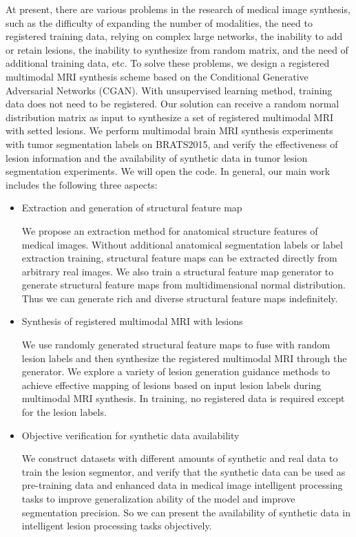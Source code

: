 \documentclass{ecai}
\begin{document}
At present, there are various problems in the research of medical image synthesis, such as the difficulty of expanding the number of modalities, the need to registered training data, relying on complex large networks, the inability to add or retain lesions, the inability to synthesize from random matrix, and the need of additional training data, etc. 
To solve these problems, we design a registered multimodal MRI synthesis scheme based on the Conditional Generative Adversarial Networks (CGAN)\cite{70mirza2014conditional}. With unsupervised learning method, training data does not need to be registered. Our solution can receive a random normal distribution matrix as input to synthesize a set of registered multimodal MRI with setted lesions. We perform multimodal brain MRI synthesis experiments with tumor segmentation labels on BRATS2015, and verify the effectiveness of lesion information and the availability of synthetic data in tumor lesion segmentation experiments. We will open the code. In general, our main work includes the following three aspects:

\begin{itemize}
	\item{Extraction and generation of structural feature map}
	
	We propose an extraction method for anatomical structure features of medical images. Without additional anatomical segmentation labels or label extraction training, structural feature maps can be extracted directly from arbitrary real images. We also train a structural feature map generator to generate structural feature maps from multidimensional normal distribution. Thus we can generate rich and diverse structural feature maps indefinitely.
	\item{Synthesis of registered multimodal MRI with lesions}	
	
	We use randomly generated structural feature maps to fuse with random lesion labels and then synthesize the registered multimodal MRI through the generator. We explore a variety of lesion generation guidance methods to achieve effective mapping of lesions based on input lesion labels during multimodal MRI synthesis. In training, no registered data is required except for the lesion labels. 
	\item{Objective verification for synthetic data availability}
	
	We construct datasets with different amounts of synthetic and real data to train the lesion segmentor, and verify that the synthetic data can be used as pre-training data and enhanced data in medical image intelligent processing tasks to improve generalization ability of the model and improve segmentation precision. So we can present the availability of synthetic data in intelligent lesion processing tasks objectively.
\end{itemize}
\end{document}
